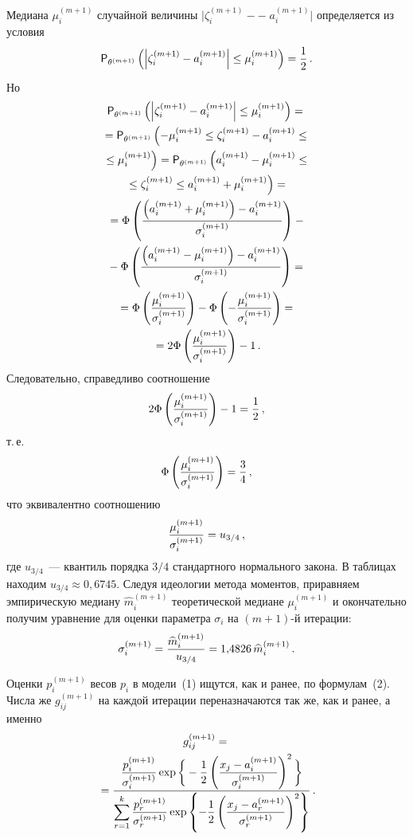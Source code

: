 \begin{multicols}{2}
Медиана $\mu_i^{(m+1)}$ случайной величины
$\bigg|\zeta_i^{(m+1)}-$\linebreak $-\;a_i^{(m+1)}\bigg|$ определяется из условия
$$
{\sf
P}_{\theta^{(m+1)}}\left (\left | \zeta_i^{(m+1)}-a_i^{(m+1)}\right |\le\mu_i^{(m+1)}\right )=\fr{1}{2}\,.
$$
Но
\begin{multline*}
{\sf P}_{\theta^{(m+1)}}\left(\left |\zeta_i^{(m+1)}-a_i^{(m+1)}\right |\le\mu_i^{(m+1)}\right)={}
\\
{}={\sf
P}_{\theta^{(m+1)}}\left(-\mu_i^{(m+1)}\le\zeta_i^{(m+1)}-a_i^{(m+1)}\le{}\right.\\
\left.{}\le \mu_i^{(m+1)}\right)=
{\sf
P}_{\theta^{(m+1)}}\left(a_i^{(m+1)}-\mu_i^{(m+1)}\le{}\right.\\
\left.{}\le
\zeta_i^{(m+1)}\le a_i^{(m+1)}+\mu_i^{(m+1)}\right)= {}
\\
{}=\Phi\left(\fr{\left (a_i^{(m+1)}+\mu_i^{(m+1)}\right )-a_i^{(m+1)}}
{\sigma_i^{(m+1)}}\right)-{}\\
{}-\Phi\left(\fr{\left( a_i^{(m+1)}-\mu_i^{(m+1)}\right )-a_i^{(m+1)}}{\sigma_i^{(m+1)}}\right)={}
\\
{}=
\Phi\left(\fr{\mu_i^{(m+1)}}{\sigma_i^{(m+1)}}\right)-\Phi\left(-\fr{\mu_i^{(m+1)}}{\sigma_i^{(m+1)}}\right)={}\\
{}=
2\Phi\left(\fr{\mu_i^{(m+1)}}{\sigma_i^{(m+1)}}\right)-1\,.
\end{multline*}
Следовательно, справедливо соотношение
$$
2\Phi\left(\fr{\mu_i^{(m+1)}}{\sigma_i^{(m+1)}}\right)-1=\fr{1}{2}\,,
$$
т.\,е.\
$$
\Phi\left(\fr{\mu_i^{(m+1)}}{\sigma_i^{(m+1)}}\right)=\fr{3}{4}\,,
$$
что эквивалентно соотношению
$$
\fr{\mu_i^{(m+1)}}{\sigma_i^{(m+1)}}=u_{3/4}\,,
$$
где $u_{3/4}$~---
квантиль порядка $3/4$ стандартного нормального закона. В таблицах
находим $u_{3/4}\approx 0{,}6745$. Следуя идеологии метода моментов,
приравняем эмпирическую медиану $\widehat m_i^{(m+1)}$
теоретической медиане $\mu_i^{(m+1)}$ и окончательно получим
уравнение для оценки параметра $\sigma_i$ на $(m+1)$-й итерации:
\begin{equation}
\sigma_i^{(m+1)}=\fr{\widehat
m_i^{(m+1)}}{u_{3/4}}=1{,}4826\,\widehat m_i^{(m+1)}\,.
\end{equation}

Оценки $p_i^{(m+1)}$ весов $p_i$ в модели~(1) ищутся, как и ранее,
по формулам~(2). Числа же $g_{ij}^{(m+1)}$ на каждой итерации
переназначаются так же, как и ранее, а именно
\begin{multline}
g_{ij}^{(m+1)}={}\\
{}=\fr{\fr{p_i^{(m+1)}}{\sigma_i^{(m+1)}}\exp\bigg\{-\fr{1}{2}\left(
\fr{x_j-a_i^{(m+1)}}{\sigma_i^{(m+1)}}\right)^2\bigg\}}
{{\displaystyle{\sum\limits_{r=1}^k\fr{p_r^{(m+1)}}{\sigma_r^{(m+1)}}\exp\left\{
-\fr{1}{2}\left(\fr{x_j-a_r^{(m+1)}}{\sigma_r^{(m+1)}}\right)^2\right\}}}}
\,.
\end{multline}


\end{multicols}

